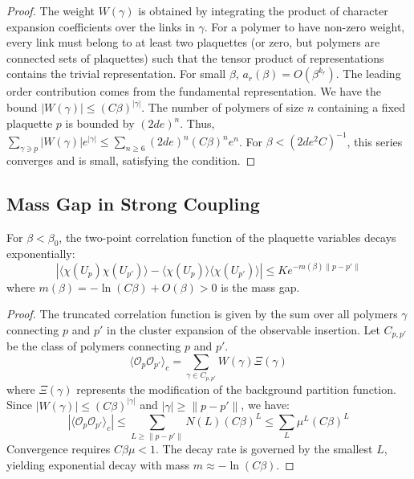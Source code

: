 \begin{proof}
The weight $W(\gamma)$ is obtained by integrating the product of character expansion coefficients over the links in $\gamma$. For a polymer to have non-zero weight, every link must belong to at least two plaquettes (or zero, but polymers are connected sets of plaquettes) such that the tensor product of representations contains the trivial representation.
For small $\beta$, $a_r(\beta) = O(\beta^{k_r})$. The leading order contribution comes from the fundamental representation.
We have the bound $|W(\gamma)| \le (C \beta)^{|\gamma|}$.
The number of polymers of size $n$ containing a fixed plaquette $p$ is bounded by $(2d e)^n$.
Thus, $\sum_{\gamma \ni p} |W(\gamma)| e^{|\gamma|} \le \sum_{n \ge 6} (2d e)^n (C \beta)^n e^n$.
For $\beta < (2de^2 C)^{-1}$, this series converges and is small, satisfying the condition.
\end{proof}

\subsection{Mass Gap in Strong Coupling}
\begin{theorem}
For $\beta < \beta_0$, the two-point correlation function of the plaquette variables decays exponentially:
\begin{equation}
|\langle \chi(U_p) \chi(U_{p'}) \rangle - \langle \chi(U_p) \rangle \langle \chi(U_{p'}) \rangle| \le K e^{-m(\beta) \|p - p'\|}
\end{equation}
where $m(\beta) = - \ln(C \beta) + O(\beta) > 0$ is the mass gap.
\end{theorem}

\begin{proof}
The truncated correlation function is given by the sum over all polymers $\gamma$ connecting $p$ and $p'$ in the cluster expansion of the observable insertion.
Let $C_{p,p'}$ be the class of polymers connecting $p$ and $p'$.
\begin{equation}
\langle \mathcal{O}_p \mathcal{O}_{p'} \rangle_c = \sum_{\gamma \in C_{p,p'}} W(\gamma) \Xi(\gamma)
\end{equation}
where $\Xi(\gamma)$ represents the modification of the background partition function.
Since $|W(\gamma)| \le (C \beta)^{|\gamma|}$ and $|\gamma| \ge \|p - p'\|$, we have:
\begin{equation}
|\langle \mathcal{O}_p \mathcal{O}_{p'} \rangle_c| \le \sum_{L \ge \|p-p'\|} N(L) (C \beta)^L \le \sum_{L} \mu^L (C \beta)^L
\end{equation}
Convergence requires $C \beta \mu < 1$. The decay rate is governed by the smallest $L$, yielding exponential decay with mass $m \approx -\ln(C \beta)$.
\end{proof}

